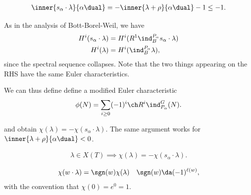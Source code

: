 \begin{align*}  
\inner{s_\alpha\cdot\lambda}{\alpha\dual} = -\inner{\lambda+\rho}{\alpha\dual} - 1 \leq - 1
.\end{align*}

As in the analysis of Bott-Borel-Weil, we have
\begin{align*}  
H^i(s_\alpha \cdot\lambda) &= H^i( R^1 \ind_B^{P_\alpha} s_\alpha\cdot\lambda ) \\
H^i(\lambda) &= H^i( \ind_B^{P_\alpha}\lambda )
,\end{align*} since the spectral sequence collapses. Note that the two
things appearing on the RHS have the same Euler characteristics.

We can thus define define a modified Euler characteristic
\begin{align*}  
\phi(N) = \sum_{i\geq 0} (-1)^i \ch R^i \ind_{P_\alpha}^G(N)
.\end{align*}

and obtain \(\chi(\lambda) = -\chi(s_\alpha \cdot \lambda)\). The same
argument works for \(\inner{\lambda + \rho}{\alpha\dual} < 0\).

\begin{remark}

\begin{align*}  
\lambda \in X(T) \implies \chi(\lambda) = -\chi(s_\alpha \cdot \lambda)
.\end{align*}

\end{remark}

\begin{proposition}

\begin{align*}  
\chi(w\cdot \lambda) = \sgn(w) \chi(\lambda) && \sgn(w) \da (-1)^{\ell(w)}
,\end{align*} with the convention that \(\chi(0) = e^0 = 1\).

\end{proposition}

